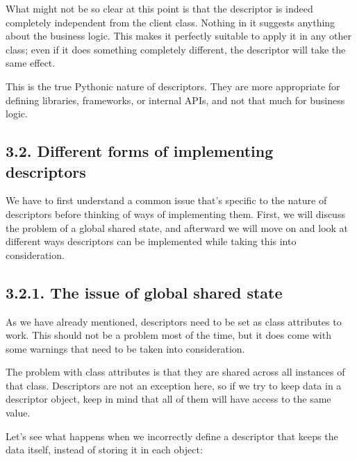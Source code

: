 \documentclass[a4paper,10pt,english]{sphinxmanual}
\begin{document}
What might not be so clear at this point is that the descriptor is indeed completely
independent from the client class. Nothing in it suggests anything about the business
logic. This makes it perfectly suitable to apply it in any other class; even if it does
something completely different, the descriptor will take the same effect.

This is the true Pythonic nature of descriptors. They are more appropriate for defining
libraries, frameworks, or internal APIs, and not that much for business logic.


\subsection{3.2. Different forms of implementing descriptors}
\label{\detokenize{chapters/6_descriptors/index:different-forms-of-implementing-descriptors}}
We have to first understand a common issue that’s specific to the nature of descriptors
before thinking of ways of implementing them. First, we will discuss the problem of a
global shared state, and afterward we will move on and look at different ways descriptors
can be implemented while taking this into consideration.


\subsection{3.2.1. The issue of global shared state}
\label{\detokenize{chapters/6_descriptors/index:the-issue-of-global-shared-state}}
As we have already mentioned, descriptors need to be set as class attributes to work. This
should not be a problem most of the time, but it does come with some warnings that need
to be taken into consideration.

The problem with class attributes is that they are shared across all instances of that class.
Descriptors are not an exception here, so if we try to keep data in a descriptor object,
keep in mind that all of them will have access to the same value.

Let’s see what happens when we incorrectly define a descriptor that keeps the data itself,
instead of storing it in each object:
\end{document}

